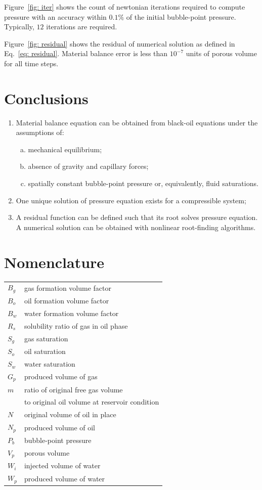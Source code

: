 \documentclass[final,authoryear,5p,twocolumn,10pt]{elsarticle}
\begin{document}
Figure~\ref{fig: iter} shows the count of newtonian iterations required to compute pressure with an accuracy within $0.1\%$ of the initial bubble-point pressure. Typically, $12$ iterations are required.

Figure~\ref{fig: residual} shows the residual of numerical solution as defined in Eq.~\eqref{eq: residual}. Material balance error is less than $10^{-7}$ units of porous volume for all time steps.



\section{Conclusions}
\begin{enumerate}[1.]
\item Material balance equation can be obtained from black-oil equations under the assumptions of:
\begin{enumerate}[(a)]
\item mechanical equilibrium;
\item absence of gravity and capillary forces;
\item spatially constant bubble-point pressure or, equivalently, fluid saturations.
\end{enumerate}
\item One unique solution of pressure equation exists for a compressible system;
\item A residual function can be defined such that its root solves pressure equation. A numerical solution can be obtained with nonlinear root-finding algorithms.
\end{enumerate}

\section*{Nomenclature}
\begin{tabular}{ll}
$B_g$ & gas formation volume factor\\
$B_o$ & oil formation volume factor\\
$B_w$ & water formation volume factor\\
$R_s$ & solubility ratio of gas in oil phase\\
$S_g$ & gas saturation \\
$S_o$ & oil saturation \\
$S_w$ & water saturation \\
$G_p$ & produced volume of gas \\
$m$ & ratio of original free gas volume \\
& to original oil volume at reservoir condition \\
$N$ & original volume of oil in place \\
$N_p$ & produced volume of oil \\
$P_b$ & bubble-point pressure \\
$V_p$ & porous volume \\
$W_i$ & injected volume of water \\
$W_p$ & produced volume of water
\end{tabular}
\end{document}
